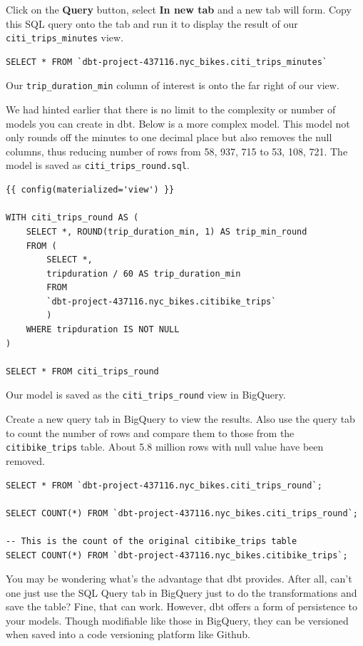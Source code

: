 \documentclass[
]{book}
\begin{document}
Click on the \textbf{Query} button, select \textbf{In new tab} and a new tab will form. Copy this SQL query onto the tab and run it to display the result of our \texttt{citi\_trips\_minutes} view.

\begin{verbatim}
SELECT * FROM `dbt-project-437116.nyc_bikes.citi_trips_minutes` 
\end{verbatim}

Our \texttt{trip\_duration\_min} column of interest is onto the far right of our view.

We had hinted earlier that there is no limit to the complexity or number of models you can create in dbt. Below is a more complex model. This model not only rounds off the minutes to one decimal place but also removes the null columns, thus reducing number of rows from 58, 937, 715 to 53, 108, 721. The model is saved as \texttt{citi\_trips\_round.sql}.

\begin{verbatim}
{{ config(materialized='view') }}

WITH citi_trips_round AS (
    SELECT *, ROUND(trip_duration_min, 1) AS trip_min_round
    FROM (
        SELECT *, 
        tripduration / 60 AS trip_duration_min
        FROM 
        `dbt-project-437116.nyc_bikes.citibike_trips`
        ) 
    WHERE tripduration IS NOT NULL
)

SELECT * FROM citi_trips_round
\end{verbatim}

Our model is saved as the \texttt{citi\_trips\_round} view in BigQuery.

Create a new query tab in BigQuery to view the results. Also use the query tab to count the number of rows and compare them to those from the \texttt{citibike\_trips} table. About 5.8 million rows with null value have been removed.

\begin{verbatim}
SELECT * FROM `dbt-project-437116.nyc_bikes.citi_trips_round`; 

SELECT COUNT(*) FROM `dbt-project-437116.nyc_bikes.citi_trips_round`;

-- This is the count of the original citibike_trips table
SELECT COUNT(*) FROM `dbt-project-437116.nyc_bikes.citibike_trips`;
\end{verbatim}

You may be wondering what's the advantage that dbt provides. After all, can't one just use the SQL Query tab in BigQuery just to do the transformations and save the table? Fine, that can work. However, dbt offers a form of persistence to your models. Though modifiable like those in BigQuery, they can be versioned when saved into a code versioning platform like Github.
\end{document}
